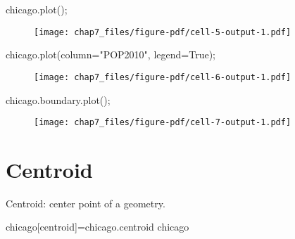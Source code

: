 \documentclass[
  letterpaper,
  DIV=11,
  numbers=noendperiod]{scrreprt}
\newenvironment{Shaded}{\begin{snugshade}}{\end{snugshade}}
\newcommand{\NormalTok}[1]{\textcolor[rgb]{0.00,0.23,0.31}{#1}}
\newcommand{\OperatorTok}[1]{\textcolor[rgb]{0.37,0.37,0.37}{#1}}
\newcommand{\StringTok}[1]{\textcolor[rgb]{0.13,0.47,0.30}{#1}}
\newcommand{\VariableTok}[1]{\textcolor[rgb]{0.07,0.07,0.07}{#1}}
\begin{document}
\begin{Shaded}
\begin{Highlighting}[]
\NormalTok{chicago.plot()}\OperatorTok{;}
\end{Highlighting}
\end{Shaded}

\begin{figure}[H]

{\centering \texttt{[image: chap7\_files/figure-pdf/cell-5-output-1.pdf]}

}

\end{figure}

\begin{Shaded}
\begin{Highlighting}[]
\NormalTok{chicago.plot(column}\OperatorTok{=}\StringTok{"POP2010"}\NormalTok{, legend}\OperatorTok{=}\VariableTok{True}\NormalTok{)}\OperatorTok{;}
\end{Highlighting}
\end{Shaded}

\begin{figure}[H]

{\centering \texttt{[image: chap7\_files/figure-pdf/cell-6-output-1.pdf]}

}

\end{figure}

\begin{Shaded}
\begin{Highlighting}[]
\NormalTok{chicago.boundary.plot()}\OperatorTok{;}
\end{Highlighting}
\end{Shaded}

\begin{figure}[H]

{\centering \texttt{[image: chap7\_files/figure-pdf/cell-7-output-1.pdf]}

}

\end{figure}

\hypertarget{centroid}{%
\section{Centroid}\label{centroid}}

Centroid: center point of a geometry.

\begin{Shaded}
\begin{Highlighting}[]
\NormalTok{chicago[}\StringTok{\textquotesingle{}centroid\textquotesingle{}}\NormalTok{]}\OperatorTok{=}\NormalTok{chicago.centroid}
\NormalTok{chicago}
\end{Highlighting}
\end{Shaded}
\end{document}
